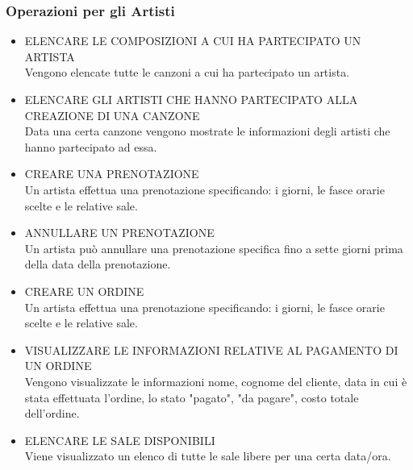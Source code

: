 \documentclass{article}
\newcounter{counteroperazioni}
\newcommand{\coperazioni}{\addtocounter{counteroperazioni}{1}\thecounteroperazioni}
\begin{document}
\subsubsection{Operazioni per gli Artisti}
\setcounter{counteroperazioni}{0}
\begin{itemize}[labelindent=1.5em,labelsep=.5cm,leftmargin=*]
    \item [\textbf{A\coperazioni)}] ELENCARE LE COMPOSIZIONI A CUI HA PARTECIPATO UN ARTISTA \\ Vengono elencate tutte le canzoni a cui ha partecipato un artista.
    \item [\textbf{A\coperazioni)}] ELENCARE GLI ARTISTI CHE HANNO PARTECIPATO ALLA CREAZIONE DI UNA CANZONE \\ Data una certa canzone vengono mostrate le informazioni degli artisti che hanno partecipato ad essa.

    \item [\textbf{A\coperazioni)}] CREARE UNA PRENOTAZIONE \\ Un artista effettua una prenotazione specificando: i giorni, le fasce orarie scelte e le relative sale. 
    \item [\textbf{A\coperazioni)}] ANNULLARE UN PRENOTAZIONE \\ Un artista può annullare una prenotazione specifica fino a sette giorni prima della data della prenotazione.
    \item [\textbf{A\coperazioni)}] CREARE UN ORDINE \\ Un artista effettua una prenotazione specificando: i giorni, le fasce orarie scelte e le relative sale. 
    \item [\textbf{A\coperazioni)}] VISUALIZZARE LE INFORMAZIONI RELATIVE AL PAGAMENTO DI UN ORDINE \\ Vengono visualizzate le informazioni nome, cognome del cliente, data in cui è stata effettuata l'ordine, lo stato "pagato", "da pagare", costo totale dell'ordine. 
    \item [\textbf{A\coperazioni)}] ELENCARE LE SALE DISPONIBILI \\ Viene visualizzato un elenco di tutte le sale libere per una certa data/ora.
\end{itemize}
\end{document}
